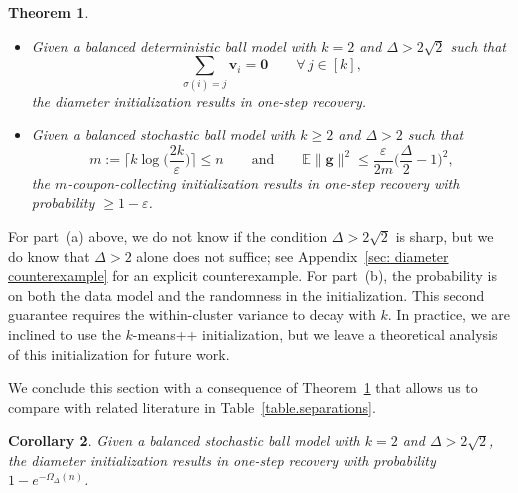 \documentclass{article}
\theoremstyle{plain}
\newtheorem{theorem}{Theorem}
\newtheorem{corollary}[theorem]{Corollary}
\theoremstyle{definition}
\newcommand{\1}{\mathbf{1}}
\begin{document}

\begin{theorem}
\label{thm:informal_choices of initialization}\
\begin{itemize}
\item[(a)] 
Given a balanced deterministic ball model with $k=2$ and $\Delta>2\sqrt{2}$ such that
\[
\sum_{\sigma(i)=j}\bm{v}_i=\bm{0}
\qquad
\forall\,j\in[k],
\]
the diameter initialization results in one-step recovery.
\item[(b)] 
Given a balanced stochastic ball model with $k\geq 2$ and $\Delta>2$ such that
\[
m:=\bigg\lceil k\log\bigg(\frac{2k}{\varepsilon}\bigg)\bigg\rceil\leq n
\qquad\text{and}\qquad
\mathbb{E}\|\bm{g}\|^2
\leq
\frac{\varepsilon}{2m}\bigg(\frac{\Delta}{2}-1\bigg)^2,
\]
the $m$-coupon-collecting initialization results in one-step recovery with probability $\geq1-\varepsilon$.
\end{itemize}
\end{theorem}

For part~(a) above, we do not know if the condition $\Delta>2\sqrt{2}$ is sharp, but we do know that $\Delta>2$ alone does not suffice; see Appendix~\ref{sec: diameter counterexample} for an explicit counterexample.
For part~(b), the probability is on both the data model and the randomness in the initialization.
This second guarantee requires the within-cluster variance to decay with $k$.
In practice, we are inclined to use the $k$-means++ initialization, but we leave a theoretical analysis of this initialization for future work.

We conclude this section with a consequence of Theorem~\ref{thm:informal_choices of initialization} that allows us to compare with related literature in Table~\ref{table.separations}.

\begin{corollary}
\label{cor:diameter-initialization-stochastic}
Given a balanced stochastic ball model with $k=2$ and $\Delta>2\sqrt{2}$, the diameter initialization results in one-step recovery with probability $1-e^{-\Omega_\Delta(n)}$.
\end{corollary}
\end{document}
